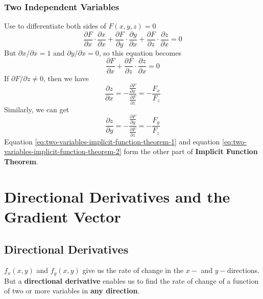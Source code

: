 \documentclass[math,code]{amznotes}
\theoremstyle{remark}
\begin{document}
\subsubsection{Two Independent Variables}
Use  to differentiate both sides of $F(x,y,z)=0$
\begin{displaymath}
    \frac{\partial F}{\partial x} \cdot \frac{\partial x}{\partial x} + \frac{\partial F}{\partial y} \cdot \frac{\partial y}{\partial x} + \frac{\partial F}{\partial z} \cdot \frac{\partial z}{\partial x} = 0
\end{displaymath}
But $\partial x / \partial x = 1$ and $\partial y / \partial x = 0$, so this equation becomes
\begin{displaymath}
    \frac{\partial F}{\partial x} + \frac{\partial F}{\partial z} \cdot \frac{\partial z}{\partial x} = 0
\end{displaymath}
If $\partial F / \partial z \neq 0$, then we have
\begin{equation} \label{eq:two-variables-implicit-function-theorem-1}
    \frac{\partial z}{\partial x} = -\frac{\frac{\partial F}{\partial x}}{\frac{\partial F}{\partial z}} = - \frac{F_x}{F_z}
\end{equation}
Similarly, we can get
\begin{equation} \label{eq:two-variables-implicit-function-theorem-2}
    \frac{\partial z}{\partial y} = -\frac{\frac{\partial F}{\partial y}}{\frac{\partial F}{\partial z}} = - \frac{F_y}{F_z}
\end{equation}
Equation \eqref{eq:two-variables-implicit-function-theorem-1} and equation \eqref{eq:two-variables-implicit-function-theorem-2} form the other part of {\color{red} \textbf{Implicit Function Theorem}}.
\section{Directional Derivatives and the Gradient Vector}
\subsection{Directional Derivatives}
$f_x(x,y)$ and $f_y(x,y)$ give us the rate of change in the $x-$ and $y-$directions. But a {\color{red} \textbf{directional derivative}} enables us to find the rate of change of a function of two or more variables in {\color{red} \textbf{any direction}}.
\end{document}
